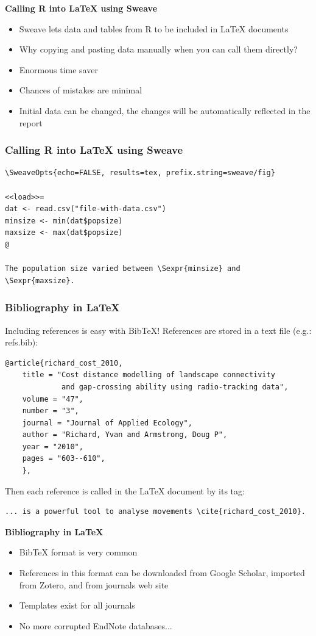 \documentclass[9pt,xcolor=pdftex,dvipsnames,table]{beamer}
\begin{document}
\begin{frame}{\textbf{Calling R into LaTeX using Sweave}}
  \begin{itemize}
  \item Sweave lets data and tables from R to be included in LaTeX documents
  \item Why copying and pasting data manually when you can call them directly?
  \item Enormous time saver
  \item Chances of mistakes are minimal
  \item Initial data can be changed, the changes will be automatically
    reflected in the report 
  \end{itemize}
\end{frame}


\begin{frame}[fragile] 
\frametitle{\textbf{Calling R into LaTeX using Sweave}}
\begin{example}[]
\begin{verbatim}
\SweaveOpts{echo=FALSE, results=tex, prefix.string=sweave/fig}

<<load>>=
dat <- read.csv("file-with-data.csv")
minsize <- min(dat$popsize)
maxsize <- max(dat$popsize)
@ 

The population size varied between \Sexpr{minsize} and \Sexpr{maxsize}.
\end{verbatim}
\end{example}
\end{frame}


\begin{frame}[fragile]
\frametitle{\textbf{Bibliography in LaTeX}}
Including references is easy with BibTeX!
References are stored in a text file (e.g.: refs.bib):
\begin{verbatim}
@article{richard_cost_2010,
    title = "Cost distance modelling of landscape connectivity 
             and gap-crossing ability using radio-tracking data",
    volume = "47",
    number = "3",
    journal = "Journal of Applied Ecology",
    author = "Richard, Yvan and Armstrong, Doug P",
    year = "2010",
    pages = "603--610",
    },
\end{verbatim}
Then each reference is called in the LaTeX document by its tag:
\begin{verbatim}
... is a powerful tool to analyse movements \cite{richard_cost_2010}.
\end{verbatim}
\end{frame}


\begin{frame}{\textbf{Bibliography in \LaTeX}}
  \begin{itemize}
  \item BibTeX format is very common
  \item References in this format can be downloaded from Google
    Scholar, imported from Zotero, and from journals web site
  \item Templates exist for all journals
  \item No more corrupted EndNote databases...
  \end{itemize}
\end{frame}
\end{document}
